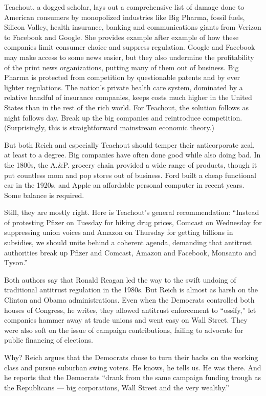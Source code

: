 Teachout, a dogged scholar, lays out a comprehensive list of damage done
to American consumers by monopolized industries like Big Pharma, fossil
fuels, Silicon Valley, health insurance, banking and communications
giants from Verizon to Facebook and Google. She provides example after
example of how these companies limit consumer choice and suppress
regulation. Google and Facebook may make access to some news easier, but
they also undermine the profitability of the print news organizations,
putting many of them out of business. Big Pharma is protected from
competition by questionable patents and by ever lighter regulations. The
nation's private health care system, dominated by a relative handful of
insurance companies, keeps costs much higher in the United States than
in the rest of the rich world. For Teachout, the solution follows as
night follows day. Break up the big companies and reintroduce
competition. (Surprisingly, this is straightforward mainstream economic
theory.)

But both Reich and especially Teachout should temper their anticorporate
zeal, at least to a degree. Big companies have often done good while
also doing bad. In the 1800s, the A.\&P. grocery chain provided a wide
range of products, though it put countless mom and pop stores out of
business. Ford built a cheap functional car in the 1920s, and Apple an
affordable personal computer in recent years. Some balance is required.

Still, they are mostly right. Here is Teachout's general recommendation:
``Instead of protesting Pfizer on Tuesday for hiking drug prices,
Comcast on Wednesday for suppressing union voices and Amazon on Thursday
for getting billions in subsidies, we should unite behind a coherent
agenda, demanding that antitrust authorities break up Pfizer and
Comcast, Amazon and Facebook, Monsanto and Tyson.''

Both authors say that Ronald Reagan led the way to the swift undoing of
traditional antitrust regulation in the 1980s. But Reich is almost as
harsh on the Clinton and Obama administrations. Even when the Democrats
controlled both houses of Congress, he writes, they allowed antitrust
enforcement to ``ossify,'' let companies hammer away at trade unions and
went easy on Wall Street. They were also soft on the issue of campaign
contributions, failing to advocate for public financing of elections.

Why? Reich argues that the Democrats chose to turn their backs on the
working class and pursue suburban swing voters. He knows, he tells us.
He was there. And he reports that the Democrats ``drank from the same
campaign funding trough as the Republicans --- big corporations, Wall
Street and the very wealthy.''

